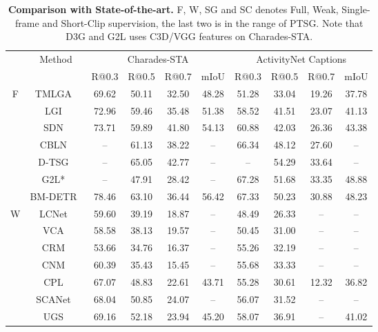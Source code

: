 \begin{table}[t]
\footnotesize
\setlength\tabcolsep{0.8pt}
\centering
\caption{\textbf{Comparison with State-of-the-art.} F, W, SG and SC denotes Full, Weak, Single-frame and Short-Clip supervision, the last two is in the range of PTSG. Note that D3G and G2L uses C3D/VGG features on Charades-STA.}
\vspace{-0.3cm}
\begin{tabular}{cc|c|cccc|cccc}
\toprule 
\multicolumn{2}{c|}{\multirow{2}{*}{}} & \multirow{2}{*}{Method} & \multicolumn{4}{c|}{Charades-STA} & \multicolumn{4}{c}{ActivityNet Captions} \\ \cline{4-11} 
\multicolumn{2}{c|}{} &  & R@0.3 & R@0.5 & R@0.7 & mIoU & R@0.3 & R@0.5 & R@0.7 & mIoU \\ \hline
\multicolumn{2}{c|}{\multirow{7}{*}{F}} & TMLGA~\cite{b20}  & 69.62 & 50.11 & 32.50 & \multicolumn{1}{c|}{48.28} & 51.28 & 33.04 & 19.26 & 37.78 \\
\multicolumn{2}{c|}{} & LGI~\cite{b26}  & 72.96 & 59.46 & 35.48 & \multicolumn{1}{c|}{51.38} & 58.52 & 41.51 & 23.07 & 41.13 \\
\multicolumn{2}{c|}{} & SDN~\cite{b21}  & 73.71 & 59.89 & 41.80 & \multicolumn{1}{c|}{54.13} & 60.88 & 42.03 & 26.36 & 43.38 \\
\multicolumn{2}{c|}{} & CBLN~\cite{b27}  & -- & 61.13 & 38.22 & \multicolumn{1}{c|}{--} & 66.34 & 48.12 & 27.60 & -- \\
\multicolumn{2}{c|}{} & D-TSG~\cite{b28}  & -- & 65.05 & 42.77 & \multicolumn{1}{c|}{--} & -- & 54.29 & 33.64 & -- \\
\multicolumn{2}{c|}{} & G2L*~\cite{b23}  & -- & 47.91 & 28.42 & \multicolumn{1}{c|}{--} & 67.28 & 51.68 & 33.35 & 48.88 \\
\multicolumn{2}{c|}{} & BM-DETR~\cite{b22}  & 78.46 & 63.10 & 36.44 & \multicolumn{1}{c|}{56.42} & 67.33 & 50.23 & 30.88 & 48.23 \\

\hline \hline
\multicolumn{2}{c|}{\multirow{7}{*}{W}} & LCNet~\cite{b30}  & 59.60 & 39.19 & 18.87 & \multicolumn{1}{c|}{--} & 48.49 & 26.33 & -- & -- \\
\multicolumn{2}{c|}{} & VCA~\cite{b31} & 58.58 & 38.13 & 19.57 & \multicolumn{1}{c|}{--} & 50.45 & 31.00 & -- & -- \\
\multicolumn{2}{c|}{} & CRM~\cite{b32} & 53.66 & 34.76 & 16.37 & \multicolumn{1}{c|}{--}  & 55.26 & 32.19 & -- & -- \\
\multicolumn{2}{c|}{} & CNM~\cite{b24}  & 60.39 & 35.43 & 15.45 & \multicolumn{1}{c|}{--}  & 55.68 & 33.33 & -- & -- \\
\multicolumn{2}{c|}{} & CPL~\cite{b12} & 67.07 & 48.83 & 22.61 & \multicolumn{1}{c|}{43.71} & 55.28 & 30.61 & 12.32 & 36.82 \\
\multicolumn{2}{c|}{} & SCANet~\cite{b33} & 68.04 & 50.85 & 24.07 & \multicolumn{1}{c|}{--} & 56.07 & 31.52 & -- & -- \\
\multicolumn{2}{c|}{} & UGS~\cite{b34} & 69.16 & 52.18 & 23.94 & \multicolumn{1}{c|}{45.20} & 58.07 & 36.91 & -- & 41.02 \\


\end{tabular}
\end{table}

